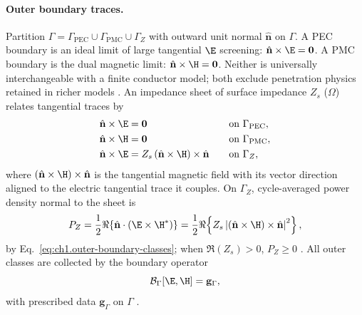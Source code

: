 \paragraph{Outer boundary traces.}
Partition $\Gamma=\Gamma_{\mathrm{PEC}}\cup\Gamma_{\mathrm{PMC}}\cup\Gamma_Z$ with outward unit normal $\hat{\mathbf{n}}$ on $\Gamma$. A PEC boundary is an ideal limit of large tangential $\E$ screening: $\hat{\mathbf{n}}\times\E=\mathbf{0}$. A PMC boundary is the dual magnetic limit: $\hat{\mathbf{n}}\times\H=\mathbf{0}$. Neither is universally interchangeable with a finite conductor model; both exclude penetration physics retained in richer models \cite{stratton1941}. An impedance sheet of surface impedance $Z_s$ ($\Omega$) relates tangential traces by
\begin{equation}
\label{eq:ch1.outer-boundary-classes}
\begin{aligned}
\hat{\mathbf{n}}\times\E&=\mathbf{0}\quad &&\text{on }\Gamma_{\mathrm{PEC}},\\
\hat{\mathbf{n}}\times\H&=\mathbf{0}\quad &&\text{on }\Gamma_{\mathrm{PMC}},\\
\hat{\mathbf{n}}\times\E&=Z_s\,(\hat{\mathbf{n}}\times\H)\times\hat{\mathbf{n}}
\quad &&\text{on }\Gamma_Z,
\end{aligned}
\end{equation}
where $(\hat{\mathbf{n}}\times\H)\times\hat{\mathbf{n}}$ is the tangential magnetic field with its vector direction aligned to the electric tangential trace it couples. On $\Gamma_Z$, cycle-averaged power density normal to the sheet is
\begin{equation}
\label{eq:ch1.impedance-boundary-power}
P_Z=
\frac{1}{2}\Re\!\left\{
\hat{\mathbf{n}}\cdot\left(\E\times\H^*\right)
\right\}
=\frac{1}{2}\Re\!\left\{
Z_s\left|(\hat{\mathbf{n}}\times\H)\times\hat{\mathbf{n}}\right|^2
\right\},
\end{equation}
by Eq.~\eqref{eq:ch1.outer-boundary-classes}; when $\Re(Z_s)>0$, $P_Z\ge 0$ \cite{stratton1941}. All outer classes are collected by the boundary operator
\begin{equation}
\label{eq:ch1.boundary-data-operator}
\mathcal{B}_\Gamma[\E,\H]=\mathbf{g}_\Gamma,
\end{equation}
with prescribed data $\mathbf{g}_\Gamma$ on $\Gamma$ \cite{stratton1941}.
\label{eq:ch1.data-specification-tuple}

